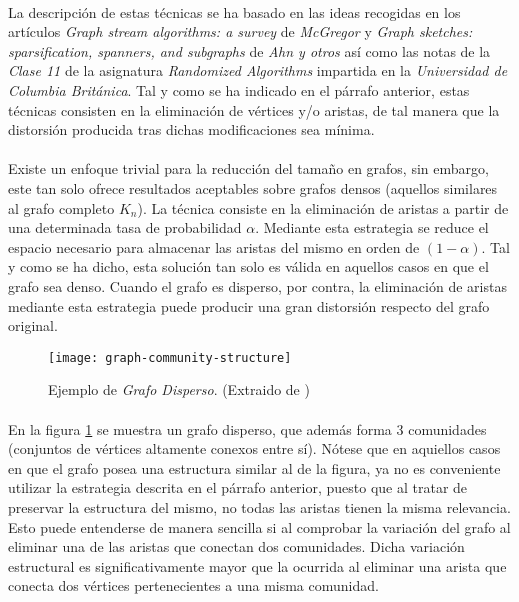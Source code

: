 \documentclass{subfiles}
\begin{document}
      \paragraph{}
      La descripción de estas técnicas se ha basado en las ideas recogidas en los artículos \emph{Graph stream algorithms: a survey} \cite{mcgregor2014graph} de \emph{McGregor} y \emph{Graph sketches: sparsification, spanners, and subgraphs} \cite{ahn2012graph} de \emph{Ahn y otros} así como las notas de la \emph{Clase 11} de la asignatura \emph{Randomized Algorithms} \cite{harvey2011randomized} impartida en la \emph{Universidad de Columbia Británica}. Tal y como se ha indicado en el párrafo anterior, estas técnicas consisten en la eliminación de vértices y/o aristas, de tal manera que la distorsión producida tras dichas modificaciones sea mínima.

      \paragraph{}
      Existe un enfoque trivial para la reducción del tamaño en grafos, sin embargo, este tan solo ofrece resultados aceptables sobre grafos densos (aquellos similares al grafo completo $K_n$). La técnica consiste en la eliminación de aristas a partir de una determinada tasa de probabilidad $\alpha$. Mediante esta estrategia se reduce el espacio necesario para almacenar las aristas del mismo en orden de $(1-\alpha)$. Tal y como se ha dicho, esta solución tan solo es válida en aquellos casos en que el grafo sea denso. Cuando el grafo es disperso, por contra, la eliminación de aristas mediante esta estrategia puede producir una gran distorsión respecto del grafo original.

      \begin{figure}
        \centering
        \texttt{[image: graph-community-structure]}
        \caption{Ejemplo de \emph{Grafo Disperso}. (Extraido de \cite{wiki:Community_structure})}
        \label{img:graph_community_structure}
      \end{figure}

      \paragraph{}
      En la figura \ref{img:graph_community_structure} se muestra un grafo disperso, que además forma 3 comunidades (conjuntos de vértices altamente conexos entre sí). Nótese que en aquiellos casos en que el grafo posea una estructura similar al de la figura, ya no es conveniente utilizar la estrategia descrita en el párrafo anterior, puesto que al tratar de preservar la estructura del mismo, no todas las aristas tienen la misma relevancia. Esto puede entenderse de manera sencilla si al comprobar la variación del grafo al eliminar una de las aristas que conectan dos comunidades. Dicha variación estructural es significativamente mayor que la ocurrida al eliminar una arista que conecta dos vértices pertenecientes a una misma comunidad.
\end{document}
